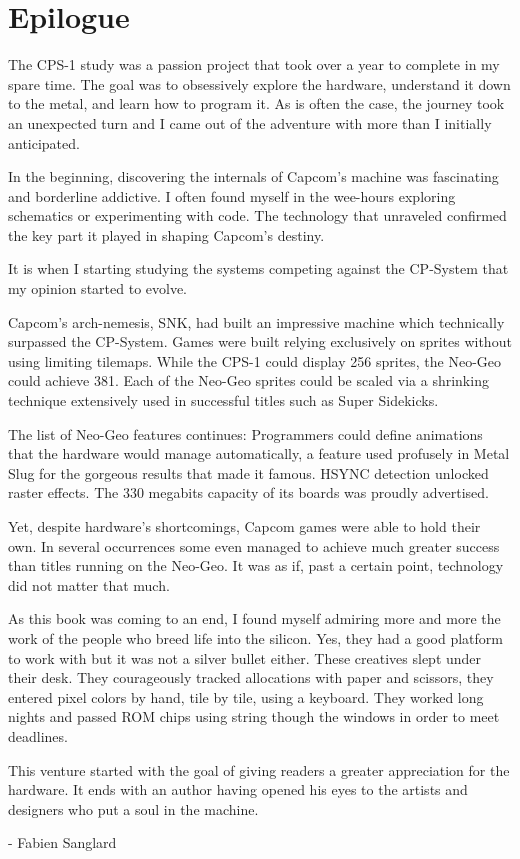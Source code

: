 \chapter{Epilogue} 

The CPS-1 study was a passion project that took over a year to complete in my spare time. The goal was to obsessively explore the hardware, understand it down to the metal, and learn how to program it. As is often the case, the journey took an unexpected turn and I came out of the adventure with more than I initially anticipated.

In the beginning, discovering the internals of Capcom's machine was fascinating and borderline addictive. I often found myself in the wee-hours exploring schematics or experimenting with code. The technology that unraveled confirmed the key part it played in shaping Capcom's destiny. 

It is when I starting studying the systems competing against the CP-System that my opinion started to evolve. 

Capcom's arch-nemesis, SNK, had built an impressive machine which technically surpassed the CP-System. Games were built relying exclusively on sprites without using limiting tilemaps. While the CPS-1 could display 256 sprites, the Neo-Geo could achieve 381. Each of the Neo-Geo sprites could be scaled via a shrinking technique extensively used in successful titles such as Super Sidekicks. 

The list of Neo-Geo features continues: Programmers could define animations that the hardware would manage automatically, a feature used profusely in Metal Slug for the gorgeous results that made it famous. HSYNC detection unlocked raster effects. The 330 megabits capacity of its boards was proudly advertised.

Yet, despite hardware's shortcomings, Capcom games were able to hold their own. In several occurrences some even managed to achieve much greater success than titles running on the Neo-Geo. It was as if, past a certain point, technology did not matter that much.

As this book was coming to an end, I found myself admiring more and more the work of the people who breed life into the silicon. Yes, they had a good platform to work with but it was not a silver bullet either. These creatives slept under their desk. They courageously tracked allocations with paper and scissors, they entered pixel colors by hand, tile by tile, using a keyboard. They worked long nights and passed ROM chips using string though the windows in order to meet deadlines.

This venture started with the goal of giving readers a greater appreciation for the hardware. It ends with an author having opened his eyes to the artists and designers who put a soul in the machine.

- Fabien Sanglard

